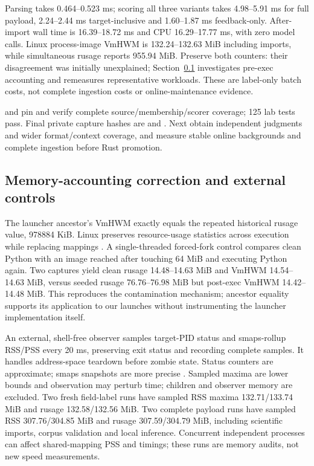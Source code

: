 \documentclass[11pt]{article}
\begin{document}
Parsing takes 0.464--0.523 ms; scoring all three variants takes 4.98--5.91 ms
for full payload, 2.24--2.44 ms target-inclusive and 1.60--1.87 ms feedback-only.
After-import wall time is 16.39--18.72 ms and CPU 16.29--17.77 ms, with zero
model calls. Linux process-image VmHWM is 132.24--132.63 MiB including imports,
while simultaneous rusage reports 955.94 MiB. Preserve both counters: their
disagreement was initially unexplained; Section~\ref{sec:memoryaudit} investigates
pre-exec accounting and remeasures representative workloads. These are label-only batch costs, not complete
ingestion costs or online-maintenance evidence.

 and  pin and verify complete
source/membership/scorer coverage; 125 lab tests pass. Final private capture hashes
are 
and .
Next obtain independent judgments and wider format/context coverage, and measure
stable online backgrounds and complete ingestion before Rust promotion.

\subsection{Memory-accounting correction and external controls}\label{sec:memoryaudit}
The launcher ancestor's VmHWM exactly equals the repeated historical rusage value,
978884 KiB. Linux preserves resource-usage statistics across execution while
replacing mappings \cite{linuxgetrusage,linuxexecve}. A single-threaded forced-fork
control compares clean Python with an image reached after touching 64 MiB and
executing Python again. Two captures yield clean rusage 14.48--14.63 MiB and
VmHWM 14.54--14.63 MiB, versus seeded rusage 76.76--76.98 MiB but post-exec
VmHWM 14.42--14.48 MiB. This reproduces the contamination mechanism; ancestor
equality supports its application to our launches without instrumenting the
launcher implementation itself.

An external, shell-free observer samples target-PID status and smaps-rollup RSS/PSS
every 20 ms, preserving exit status and recording complete samples. It handles
address-space teardown before zombie state. Status counters are approximate;
smaps snapshots are more precise \cite{linuxproc}. Sampled maxima are lower bounds
and observation may perturb time; children and observer memory are excluded.
Two fresh field-label runs have sampled RSS maxima 132.71/133.74 MiB and rusage
132.58/132.56 MiB. Two complete payload runs have sampled RSS 307.76/304.85 MiB
and rusage 307.59/304.79 MiB, including scientific imports, corpus validation and
local inference. Concurrent independent processes can affect shared-mapping PSS
and timings; these runs are memory audits, not new speed measurements.
\end{document}
